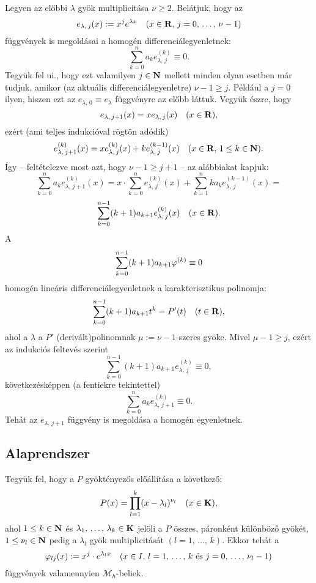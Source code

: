 Legyen az előbbi $\lambda$ gyök multiplicitása $\nu \geq 2$. Belátjuk, hogy az
\[
	e_{\lambda, \, j}(x) := x^j e^{\lambda x} \quad (x \in \mathbf{R}, \, j = 0, \, \dots, \, \nu - 1)
\]
függvények is megoldásai a homogén differenciálegyenletnek:
\[
	\sum_{k=0}^n a_k e_{\lambda, \, j}^{(k)} \equiv 0.
\]
Tegyük fel ui., hogy ezt valamilyen $j \in \mathbf{N}$ mellett minden olyan esetben már tudjuk, amikor (az aktuális differenciálegyenletre) $\nu - 1 \geq j$. Például a $j=0$ ilyen, hiszen ezt az $e_{\lambda, \, 0} \equiv e_\lambda$ függvényre az előbb láttuk. Vegyük észre, hogy
\[
	e_{\lambda, \, j+1}(x) = x e_{\lambda, \, j}(x) \quad (x \in \mathbf{R}),
\]
ezért (ami teljes indukcióval rögtön adódik)
\[
	e_{\lambda, \, j+1}^{(k)}(x) = x e_{\lambda, \, j}^{(k)}(x) + k e_{\lambda, \, j}^{(k-1)}(x) \quad (x \in \mathbf{R}, \, 1 \leq k \in \mathbf{N}).
\]
Így -- feltételezve most azt, hogy $\nu -1 \geq j + 1$ -- az alábbiakat kapjuk:
\[
	\sum_{k=0}^n a_k e_{\lambda, \, j+1}^{(k)}(x)  = x \cdot \sum_{k=0}^n e_{\lambda, \, j}^{(k)}(x) + \sum_{k=1}^n k a_k e_{\lambda, \, j}^{(k-1)}(x) =
\]
\[
	\sum_{k=0}^{n-1} (k+1) a_{k+1} e_{\lambda, \, j}^{(k)}(x) \quad (x \in \mathbf{R}).
\]
A
\[
	\sum_{k=0}^{n-1} (k+1)a_{k+1} \varphi^{(k)} \equiv 0
\]
homogén lineáris differenciálegyenletnek a karakterisztikus polinomja:
\[
	\sum_{k=0}^{n-1} (k+1)a_{k+1} t^k = P'(t) \quad (t \in \mathbf{R}),
\]
ahol a $\lambda$ a $P'$ (derivált)polinomnak $\mu := \nu - 1$-szeres gyöke. Mivel $\mu - 1 \geq j$, ezért az indukciós feltevés szerint
\[
	\sum_{k=0}^{n-1}(k+1)a_{k+1}e_{\lambda, \, j}^{(k)} \equiv 0,
\]
következésképpen (a fentiekre tekintettel)
\[
	\sum_{k=0}^{n} a_k e_{\lambda, \, j+1}^{(k)} \equiv 0.
\]
Tehát az $e_{\lambda, \, j+1}$ függvény is megoldása a homogén egyenletnek.\\

\subsection{Alaprendszer}

Tegyük fel, hogy a $P$ gyöktényezős előállítása a következő:
\[
	P(x) = \prod_{l = 1}^k (x - \lambda_l)^{\nu_l} \quad (x \in \mathbf{K}),
\]
ahol $1 \leq k \in \mathbf{N}$ és $\lambda_1, \, \dots, \, \lambda_k \in \mathbf{K}$ jelöli a $P$ összes, páronként különböző gyökét, $1 \leq \nu_l \in \mathbf{N}$ pedig a $\lambda_l$ gyök multiplicitását $(l = 1, \, \dots, \, k)$. Ekkor tehát a
\[
	\varphi_{lj}(x) := x^j \cdot e^{\lambda_l x} \quad (x \in I, \, l = 1, \, \dots, \, k \text{ és } j = 0, \, \dots, \, \nu_l - 1)
\]
függvények valamennyien $\mathcal{M}_h$-beliek.\\

